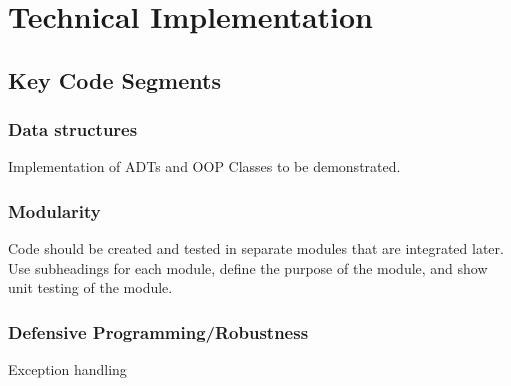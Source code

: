 \chapter{Technical Implementation}
\section{Key Code Segments}
\subsection{Data structures}
Implementation of ADTs and OOP Classes to be demonstrated.

\subsection{Modularity}
Code should be created and tested in separate modules that are integrated later. Use subheadings for each module, define the purpose of the module, and show unit testing of the module.

\subsection{Defensive Programming/Robustness}
Exception handling